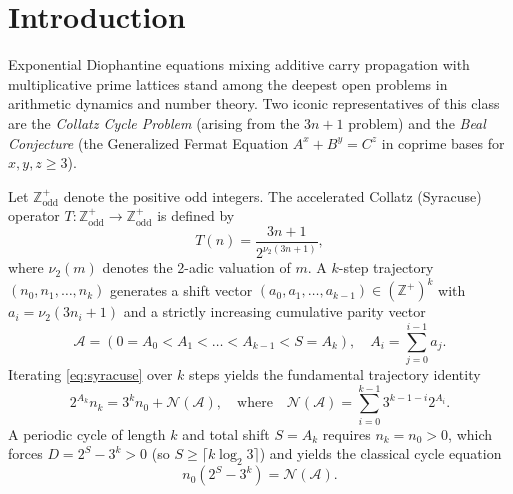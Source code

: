 \documentclass[11pt, a4paper]{amsart}
\theoremstyle{definition}
\newcommand{\Z}{\mathbb{Z}}
\newcommand{\N}{\mathcal{N}}
\newcommand{\A}{\mathcal{A}}
\begin{document}
\section{Introduction}

Exponential Diophantine equations mixing additive carry propagation with multiplicative prime lattices stand among the deepest open problems in arithmetic dynamics and number theory. Two iconic representatives of this class are the \emph{Collatz Cycle Problem} (arising from the $3n+1$ problem) and the \emph{Beal Conjecture} (the Generalized Fermat Equation $A^x + B^y = C^z$ in coprime bases for $x, y, z \ge 3$).

Let $\Z_{\text{odd}}^+$ denote the positive odd integers. The accelerated Collatz (Syracuse) operator $T: \Z_{\text{odd}}^+ \to \Z_{\text{odd}}^+$ is defined by
\begin{equation}\label{eq:syracuse}
T(n) = \frac{3n + 1}{2^{\nu_2(3n+1)}},
\end{equation}
where $\nu_2(m)$ denotes the 2-adic valuation of $m$. A $k$-step trajectory $(n_0, n_1, \dots, n_k)$ generates a shift vector $(a_0, a_1, \dots, a_{k-1}) \in (\Z^+)^k$ with $a_i = \nu_2(3n_i + 1)$ and a strictly increasing cumulative parity vector
\begin{equation}
\A = (0 = A_0 < A_1 < \dots < A_{k-1} < S = A_k), \quad A_i = \sum_{j=0}^{i-1} a_j.
\end{equation}
Iterating \eqref{eq:syracuse} over $k$ steps yields the fundamental trajectory identity
\begin{equation}\label{eq:traj_id}
2^{A_k} n_k = 3^k n_0 + \N(\A), \quad \text{where} \quad \N(\A) = \sum_{i=0}^{k-1} 3^{k-1-i} 2^{A_i}.
\end{equation}
A periodic cycle of length $k$ and total shift $S = A_k$ requires $n_k = n_0 > 0$, which forces $D = 2^S - 3^k > 0$ (so $S \ge \lceil k \log_2 3 \rceil$) and yields the classical cycle equation
\begin{equation}\label{eq:cycle_eq}
n_0 (2^S - 3^k) = \N(\A).
\end{equation}
\end{document}
